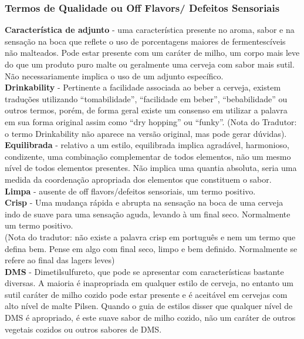 \subsubsection*{Termos de Qualidade ou Off Flavors/ Defeitos Sensoriais}
\textbf{Característica de adjunto} - uma característica presente no aroma, sabor e na sensação na boca que reflete o uso de porcentagens maiores de fermentescíveis não malteados.  Pode estar presente com um caráter de milho, um corpo mais leve do que um produto puro malte ou geralmente uma cerveja com sabor mais sutil. Não necessariamente implica o uso de um adjunto específico.\\
\textbf{Drinkability} - Pertinente a facilidade associada ao beber a cerveja, existem traduções utilizando “tomabilidade”, “facilidade em beber”, “bebabilidade” ou outros termos, porém, de forma geral existe um consenso em utilizar a palavra em sua forma original assim como “dry hopping” ou “funky”. (Nota do Tradutor: o termo Drinkability não aparece na versão original, mas pode gerar dúvidas).\\
\textbf{Equilibrada} - relativo a um estilo, equilibrada implica agradável, harmonioso, condizente, uma combinação complementar de todos elementos, não um mesmo nível de todos elementos presentes. Não implica uma quantia absoluta, seria uma medida da coordenação apropriada dos elementos que constituem o sabor.\\
\textbf{Limpa} - ausente de off flavors/defeitos sensoriais, um termo positivo.\\
\textbf{Crisp} - Uma mudança rápida e abrupta na sensação na boca de uma cerveja indo de suave para uma sensação aguda, levando à um final seco. Normalmente um termo positivo.\\
(Nota do tradutor: não existe a palavra crisp em português e nem um termo que defina bem. Pense em algo com final seco, limpo e bem definido. Normalmente se refere ao final das lagers leves)\\
\textbf{DMS} - Dimetilsulfureto, que pode se apresentar com características bastante diversas. A maioria é inapropriada em qualquer estilo de cerveja, no entanto um sutil caráter de milho cozido pode estar presente e é aceitável em cervejas com alto nível de malte Pilsen. Quando o guia de estilos disser que qualquer nível de DMS é apropriado, é este suave sabor de milho cozido, não um caráter de outros vegetais cozidos ou outros sabores de DMS.\\
